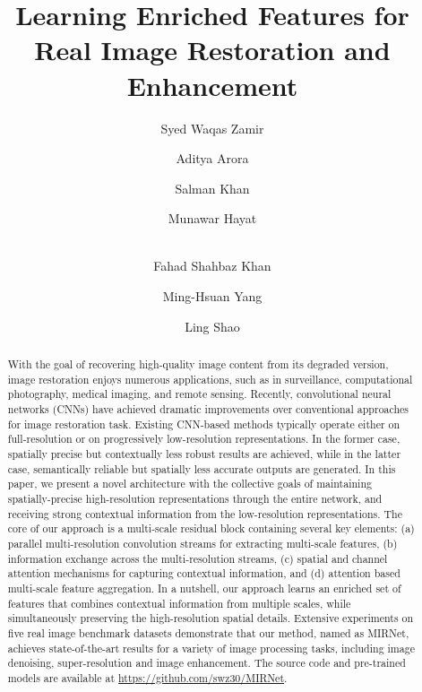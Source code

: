 \documentclass[runningheads]{llncs}
\begin{document}
\pagestyle{headings}
\mainmatter

\title{Learning Enriched Features for Real Image Restoration and Enhancement}



\author{
Syed Waqas Zamir \and
Aditya Arora \and
Salman Khan \and
Munawar Hayat \and \\
Fahad Shahbaz Khan \and
Ming-Hsuan Yang \and
Ling Shao
}
\maketitle

\vspace{-0.5em}
\begin{abstract}
With the goal of recovering high-quality image content from its degraded version, image restoration enjoys numerous applications, such as in surveillance, computational photography, medical imaging, and remote sensing. Recently, convolutional neural networks (CNNs) have achieved dramatic improvements over conventional approaches for image restoration task.
Existing CNN-based methods typically operate either on full-resolution or on progressively low-resolution representations. In the former case, spatially precise but contextually less robust results are achieved, while in the latter case, semantically reliable but spatially less accurate outputs are generated.
In this paper, we present a novel architecture with the collective goals of maintaining spatially-precise high-resolution representations through the entire network, and receiving strong contextual information from the low-resolution representations. 
The core of our approach is a multi-scale residual block containing several key elements: (a) parallel multi-resolution convolution streams for extracting multi-scale features, (b) information exchange across the multi-resolution streams, (c) spatial and channel attention mechanisms for capturing contextual information, and (d) attention based multi-scale feature aggregation.   
In a nutshell, our approach learns an enriched set of features that combines contextual information from multiple scales, while simultaneously preserving the high-resolution spatial details.
Extensive experiments on five real image benchmark datasets demonstrate that our method, named as MIRNet, achieves state-of-the-art results for a variety of image processing tasks, including image denoising, super-resolution and image enhancement. 
The source code and pre-trained models are available at \url{https://github.com/swz30/MIRNet}.

\vspace{-0.5em}
\end{abstract}
\end{document}
